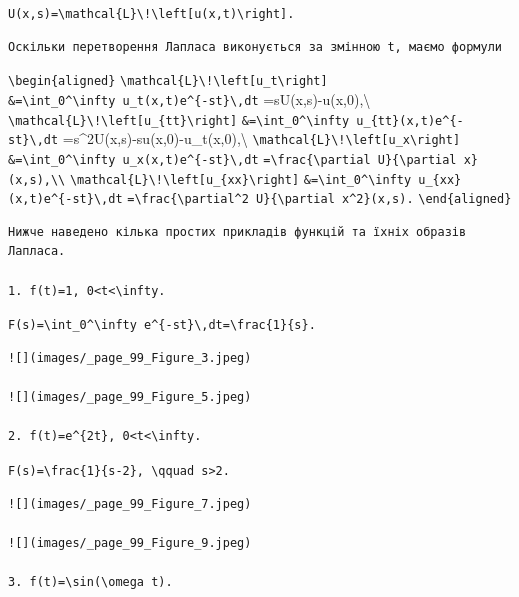 \documentclass[
  ukrainian,
]{article}
\begin{document}
\texttt{U(x,s)=\textbackslash{}mathcal\{L\}\textbackslash{}!\textbackslash{}left{[}u(x,t)\textbackslash{}right{]}.}

\begin{verbatim}
Оскільки перетворення Лапласа виконується за змінною t, маємо формули
\end{verbatim}

\texttt{\textbackslash{}begin\{aligned\}}
\texttt{\textbackslash{}mathcal\{L\}\textbackslash{}!\textbackslash{}left{[}u\_t\textbackslash{}right{]}}
\texttt{\&=\textbackslash{}int\_0\^{}\textbackslash{}infty\ u\_t(x,t)e\^{}\{-st\}\textbackslash{},dt}
=sU(x,s)-u(x,0),\textbackslash{}
\texttt{\textbackslash{}mathcal\{L\}\textbackslash{}!\textbackslash{}left{[}u\_\{tt\}\textbackslash{}right{]}}
\texttt{\&=\textbackslash{}int\_0\^{}\textbackslash{}infty\ u\_\{tt\}(x,t)e\^{}\{-st\}\textbackslash{},dt}
=s\^{}2U(x,s)-su(x,0)-u\_t(x,0),\textbackslash{}
\texttt{\textbackslash{}mathcal\{L\}\textbackslash{}!\textbackslash{}left{[}u\_x\textbackslash{}right{]}}
\texttt{\&=\textbackslash{}int\_0\^{}\textbackslash{}infty\ u\_x(x,t)e\^{}\{-st\}\textbackslash{},dt}
\texttt{=\textbackslash{}frac\{\textbackslash{}partial\ U\}\{\textbackslash{}partial\ x\}(x,s),\textbackslash{}\textbackslash{}}
\texttt{\textbackslash{}mathcal\{L\}\textbackslash{}!\textbackslash{}left{[}u\_\{xx\}\textbackslash{}right{]}}
\texttt{\&=\textbackslash{}int\_0\^{}\textbackslash{}infty\ u\_\{xx\}(x,t)e\^{}\{-st\}\textbackslash{},dt}
\texttt{=\textbackslash{}frac\{\textbackslash{}partial\^{}2\ U\}\{\textbackslash{}partial\ x\^{}2\}(x,s).}
\texttt{\textbackslash{}end\{aligned\}}

\begin{verbatim}
Нижче наведено кілька простих прикладів функцій та їхніх образів Лапласа.

1. f(t)=1, 0<t<\infty.
\end{verbatim}

\texttt{F(s)=\textbackslash{}int\_0\^{}\textbackslash{}infty\ e\^{}\{-st\}\textbackslash{},dt=\textbackslash{}frac\{1\}\{s\}.}

\begin{verbatim}
![](images/_page_99_Figure_3.jpeg)

![](images/_page_99_Figure_5.jpeg)

2. f(t)=e^{2t}, 0<t<\infty.
\end{verbatim}

\texttt{F(s)=\textbackslash{}frac\{1\}\{s-2\},\ \textbackslash{}qquad\ s\textgreater{}2.}

\begin{verbatim}
![](images/_page_99_Figure_7.jpeg)

![](images/_page_99_Figure_9.jpeg)

3. f(t)=\sin(\omega t).
\end{verbatim}
\end{document}
